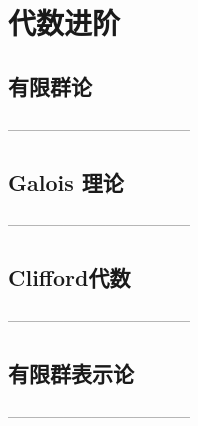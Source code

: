 \part{代数进阶} \label{prt_AlgA}
\chapter{有限群论} \label{cpt_75}
---------------------------------------


\chapter{Galois 理论} \label{cpt_76}
---------------------------------------



\chapter{Clifford代数} \label{cpt_7b}
---------------------------------------


\chapter{有限群表示论} \label{cpt_78}
---------------------------------------


